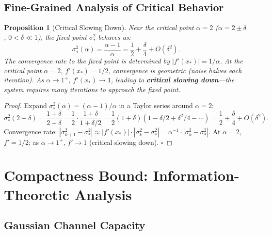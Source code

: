 \documentclass[12pt,a4paper]{article}
\newtheorem{proposition}[theorem]{Proposition}
\theoremstyle{definition}
\begin{document}
\subsection{Fine-Grained Analysis of Critical Behavior}

\begin{proposition}[Critical Slowing Down]\label{prop:critical_slowing}
Near the critical point $\alpha = 2$ ($\alpha = 2 \pm \delta$, $0 < \delta \ll 1$), the fixed point $\sigma_*^2$ behaves as:
\begin{equation}\label{eq:critical_scaling}
    \sigma_*^2(\alpha) = \frac{\alpha - 1}{\alpha} = \frac{1}{2} + \frac{\delta}{4} + O(\delta^2).
\end{equation}
The convergence rate to the fixed point is determined by $|f'(x_*)| = 1/\alpha$. At the critical point $\alpha=2$, $f'(x_*) = 1/2$, convergence is geometric (noise halves each iteration). As $\alpha \to 1^+$, $f'(x_*) \to 1$, leading to \textbf{critical slowing down}---the system requires many iterations to approach the fixed point.
\end{proposition}

\begin{proof}
Expand $\sigma_*^2(\alpha) = (\alpha - 1)/\alpha$ in a Taylor series around $\alpha=2$:
\begin{equation*}
    \sigma_*^2(2+\delta) = \frac{1+\delta}{2+\delta} = \frac{1}{2} \cdot \frac{1+\delta}{1+\delta/2} = \frac{1}{2}(1+\delta)(1 - \delta/2 + \delta^2/4 - \cdots) = \frac{1}{2} + \frac{\delta}{4} + O(\delta^2).
\end{equation*}
Convergence rate: $|\sigma_{k+1}^2 - \sigma_*^2| \approx |f'(x_*)|\cdot |\sigma_k^2 - \sigma_*^2| = \alpha^{-1} \cdot |\sigma_k^2 - \sigma_*^2|$. At $\alpha=2$, $f'=1/2$; as $\alpha \to 1^+$, $f' \to 1$ (critical slowing down). \hfill$\square$
\end{proof}

\section{Compactness Bound: Information-Theoretic Analysis}

\subsection{Gaussian Channel Capacity}
\end{document}
